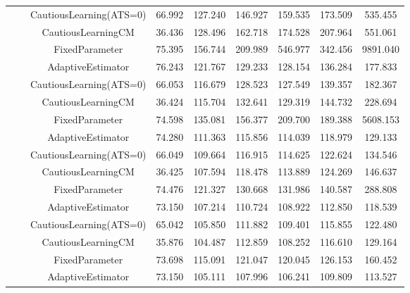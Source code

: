 \begin{table}[!h]
\begin{tabular}[t]{ccccccccc}
 &  & CautiousLearning(ATS=0) & 66.992 & 127.240 & 146.927 & 159.535 & 173.509 & 535.455\\

 &  & CautiousLearningCM & 36.436 & 128.496 & 162.718 & 174.528 & 207.964 & 551.061\\

 & \multirow[t]{-4}{*}{\centering\arraybackslash 0.35} & FixedParameter & 75.395 & 156.744 & 209.989 & 546.977 & 342.456 & 9891.040\\
\cmidrule{2-9}
 &  & AdaptiveEstimator & 76.243 & 121.767 & 129.233 & 128.154 & 136.284 & 177.833\\

 &  & CautiousLearning(ATS=0) & 66.053 & 116.679 & 128.523 & 127.549 & 139.357 & 182.367\\

 &  & CautiousLearningCM & 36.424 & 115.704 & 132.641 & 129.319 & 144.732 & 228.694\\

 & \multirow[t]{-4}{*}{\centering\arraybackslash 0.50} & FixedParameter & 74.598 & 135.081 & 156.377 & 209.700 & 189.388 & 5608.153\\
\cmidrule{2-9}
 &  & AdaptiveEstimator & 74.280 & 111.363 & 115.856 & 114.039 & 118.979 & 129.133\\

 &  & CautiousLearning(ATS=0) & 66.049 & 109.664 & 116.915 & 114.625 & 122.624 & 134.546\\

 &  & CautiousLearningCM & 36.425 & 107.594 & 118.478 & 113.889 & 124.269 & 146.637\\

 & \multirow[t]{-4}{*}{\centering\arraybackslash 0.75} & FixedParameter & 74.476 & 121.327 & 130.668 & 131.986 & 140.587 & 288.808\\
\cmidrule{2-9}
 &  & AdaptiveEstimator & 73.150 & 107.214 & 110.724 & 108.922 & 112.850 & 118.539\\

 &  & CautiousLearning(ATS=0) & 65.042 & 105.850 & 111.882 & 109.401 & 115.855 & 122.480\\

 &  & CautiousLearningCM & 35.876 & 104.487 & 112.859 & 108.252 & 116.610 & 129.164\\

 & \multirow[t]{-4}{*}{\centering\arraybackslash 1.00} & FixedParameter & 73.698 & 115.091 & 121.047 & 120.045 & 126.153 & 160.452\\
\cmidrule{2-9}
 &  & AdaptiveEstimator & 73.150 & 105.111 & 107.996 & 106.241 & 109.809 & 113.527\\


\end{tabular}
\end{table}
